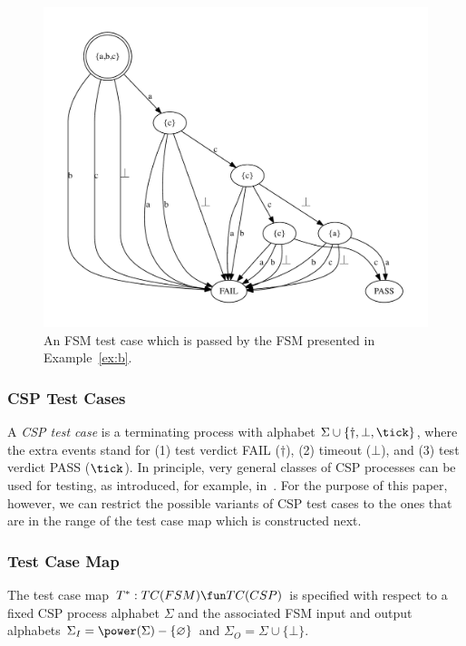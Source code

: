  \begin{figure}
 \begin{center}
\includegraphics[width=.7\textwidth]{fsm0tc.pdf}
\end{center}
\caption{An FSM test case which is passed by the FSM presented in Example~\ref{ex:b}.}
 \label{fig:fsm0tc}
 \end{figure}

 


\subsubsection*{CSP Test Cases}
A \emph{CSP test case} is a terminating process with alphabet 
$\Sigma\cup\{\dag,\bot,\tick \}$, where the extra events stand for 
(1) test  verdict FAIL ($\dag$), (2) timeout ($\bot$), and (3) test 
 verdict PASS ($\tick$). In principle, very general classes of CSP processes can be
 used for testing, as introduced, for example, in~\cite{peleska_testing_1996,peleska1997a}. For the purpose of this paper, however, we can restrict the possible variants of CSP test cases to the ones that are in the range of the test case map which is constructed next.



\subsubsection*{Test Case Map}

The test case map $T^* :TC(FSM) \fun TC(CSP)$ is specified with respect to a fixed
CSP process alphabet $\Sigma$ and the associated FSM input and output alphabets
$\Sigma_I = \power(\Sigma)-\{\varnothing\}$ and $\Sigma_O=\Sigma\cup \{\bot \}$.






